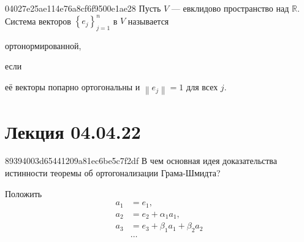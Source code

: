 \begin{note}{04027e25ae114e76a8cf6f9500e1ae28}
    Пусть \({ V }\) --- евклидово пространство над \({ \mathbb R }\).
    Система векторов \({ \left\{ e_j \right\}_{j = 1}^{n} }\) в \({ V }\) называется \begin{icloze}{2}ортонормированной,\end{icloze} если \begin{icloze}{1}её векторы попарно ортогональны и \({ \left\lVert e_j \right\rVert = 1 }\) для всех \({ j }\).\end{icloze}
\end{note}

\section{Лекция 04.04.22}

\begin{note}{89394003d65441209a81ec6be5c7f2df}
    В чем основная идея доказательства истинности теоремы об ортогонализации Грама-Шмидта?

    \begin{cloze}{1}
        Положить
        \begin{align*}
            a_1 &= e_1, \\
            a_2 &= e_2 + \alpha_1 a_1, \\
            a_3 &= e_3 + \beta_1 a_1 + \beta_2 a_2 \\
                &\ldots
        \end{align*}
    \end{cloze}
\end{note}

